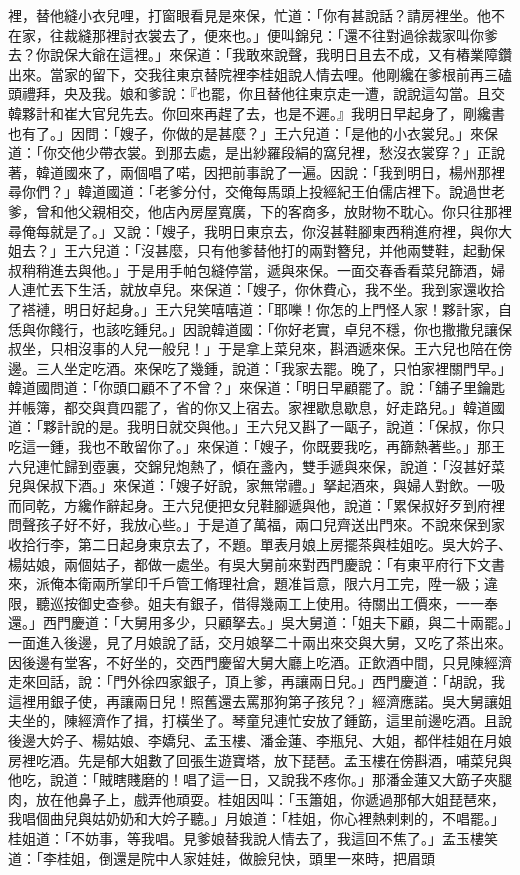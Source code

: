\begin{showcontents}{}
裡，替他縫小衣兒哩，打窗眼看見是來保，忙道：「你有甚說話？請房裡坐。他不在家，往裁縫那裡討衣裳去了，便來也。」便叫錦兒：「還不往對過徐裁家叫你爹去？你說保大爺在這裡。」來保道：「我敢來說聲，我明日且去不成，又有樁業障鑽出來。當家的留下，交我往東京替院裡李桂姐說人情去哩。他剛纔在爹根前再三磕頭禮拜，央及我。娘和爹說：『也罷，你且替他往東京走一遭，說說這勾當。且交韓夥計和崔大官兒先去。你回來再趕了去，也是不遲。』我明日早起身了，剛纔書也有了。」因問：「嫂子，你做的是甚麼？」王六兒道：「是他的小衣裳兒。」來保道：「你交他少帶衣裳。到那去處，是出紗羅段絹的窩兒裡，愁沒衣裳穿？」正說著，韓道國來了，兩個唱了喏，因把前事說了一遍。因說：「我到明日，楊州那裡尋你們？」韓道國道：「老爹分付，交俺每馬頭上投經紀王伯儒店裡下。說過世老爹，曾和他父親相交，他店內房屋寬廣，下的客商多，放財物不耽心。你只往那裡尋俺每就是了。」又說：「嫂子，我明日東京去，你沒甚鞋腳東西稍進府裡，與你大姐去？」王六兒道：「沒甚麼，只有他爹替他打的兩對簪兒，并他兩雙鞋，起動保叔稍稍進去與他。」于是用手帕包縫停當，遞與來保。一面交春香看菜兒篩酒，婦人連忙丟下生活，就放卓兒。來保道：「嫂子，你休費心，我不坐。我到家還收拾了褡褳，明日好起身。」王六兒笑嘻嘻道：「耶嚛！你怎的上門怪人家！夥計家，自恁與你餞行，也該吃鍾兒。」因說韓道國：「你好老實，卓兒不穩，你也撒撒兒讓保叔坐，只相沒事的人兒一般兒！」于是拿上菜兒來，斟酒遞來保。王六兒也陪在傍邊。三人坐定吃酒。來保吃了幾鍾，說道：「我家去罷。晚了，只怕家裡關門早。」韓道國問道：「你頭口顧不了不曾？」來保道：「明日早顧罷了。說：「舖子里鑰匙并帳簿，都交與賁四罷了，省的你又上宿去。家裡歇息歇息，好走路兒。」韓道國道：「夥計說的是。我明日就交與他。」王六兒又斟了一甌子，說道：「保叔，你只吃這一鍾，我也不敢留你了。」來保道：「嫂子，你既要我吃，再篩熱著些。」那王六兒連忙歸到壺裏，交錦兒炮熱了，傾在盞內，雙手遞與來保，說道：「沒甚好菜兒與保叔下酒。」來保道：「嫂子好說，家無常禮。」拏起酒來，與婦人對飲。一吸而同乾，方纔作辭起身。王六兒便把女兒鞋腳遞與他，說道：「累保叔好歹到府裡問聲孩子好不好，我放心些。」于是道了萬福，兩口兒齊送出門來。不說來保到家收拾行李，第二日起身東京去了，不題。單表月娘上房擺茶與桂姐吃。吳大妗子、楊姑娘，兩個姑子，都做一處坐。有吳大舅前來對西門慶說：「有東平府行下文書來，派俺本衛兩所掌印千戶管工脩理社倉，題准旨意，限六月工完，陞一級；違限，聽巡按御史查參。姐夫有銀子，借得幾兩工上使用。待關出工價來，一一奉還。」西門慶道：「大舅用多少，只顧拏去。」吳大舅道：「姐夫下顧，與二十兩罷。」一面進入後邊，見了月娘說了話，交月娘拏二十兩出來交與大舅，又吃了茶出來。因後邊有堂客，不好坐的，交西門慶留大舅大廳上吃酒。正飲酒中間，只見陳經濟走來回話，說：「門外徐四家銀子，頂上爹，再讓兩日兒。」西門慶道：「胡說，我這裡用銀子使，再讓兩日兒！照舊還去罵那狗第子孩兒？」經濟應諾。吳大舅讓姐夫坐的，陳經濟作了揖，打橫坐了。琴童兒連忙安放了鍾筯，這里前邊吃酒。且說後邊大妗子、楊姑娘、李嬌兒、孟玉樓、潘金蓮、李瓶兒、大姐，都伴桂姐在月娘房裡吃酒。先是郁大姐數了回張生遊寶塔，放下琵琶。孟玉樓在傍斟酒，哺菜兒與他吃，說道：「賊瞎賤磨的！唱了這一日，又說我不疼你。」那潘金蓮又大筯子夾腿肉，放在他鼻子上，戲弄他頑耍。桂姐因叫：「玉簫姐，你遞過那郁大姐琵琶來，我唱個曲兒與姑奶奶和大妗子聽。」月娘道：「桂姐，你心裡熱剌剌的，不唱罷。」桂姐道：「不妨事，等我唱。見爹娘替我說人情去了，我這回不焦了。」孟玉樓笑道：「李桂姐，倒還是院中人家娃娃，做臉兒快，頭里一來時，把眉頭
\end{showcontents}
